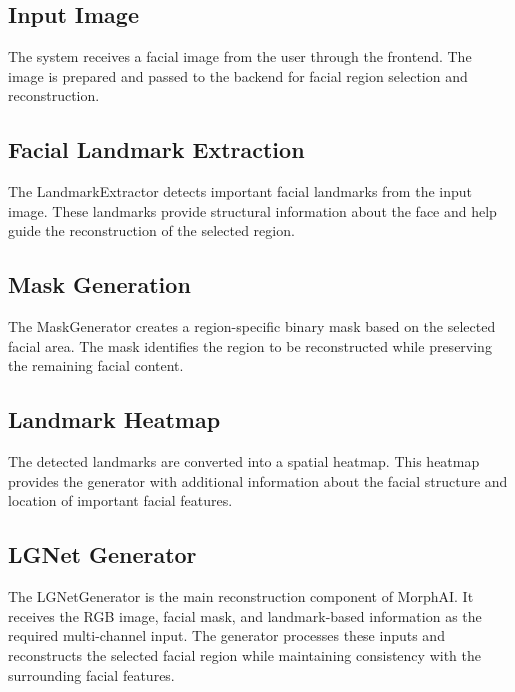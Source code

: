 
\subsection{Input Image}

The system receives a facial image from the user through the frontend.
The image is prepared and passed to the backend for facial region
selection and reconstruction.

\subsection{Facial Landmark Extraction}

The LandmarkExtractor detects important facial landmarks from the input
image. These landmarks provide structural information about the face
and help guide the reconstruction of the selected region.

\subsection{Mask Generation}

The MaskGenerator creates a region-specific binary mask based on the
selected facial area. The mask identifies the region to be reconstructed
while preserving the remaining facial content.

\subsection{Landmark Heatmap}

The detected landmarks are converted into a spatial heatmap. This
heatmap provides the generator with additional information about the
facial structure and location of important facial features.

\clearpage
\subsection{LGNet Generator}

The LGNetGenerator is the main reconstruction component of MorphAI. It
receives the RGB image, facial mask, and landmark-based information as
the required multi-channel input. The generator processes these inputs
and reconstructs the selected facial region while maintaining
consistency with the surrounding facial features.

